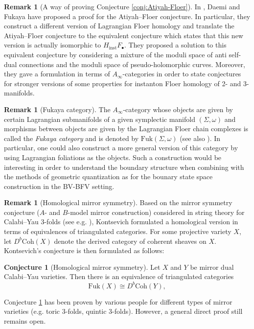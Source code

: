 \documentclass[11pt,colorinlistoftodos]{amsart}
\numberwithin{equation}{subsection}
\theoremstyle{plain}
\theoremstyle{definition}
\newtheorem{Conj}[thm]{Conjecture}
\newtheorem{rem}[thm]{Remark}
\theoremstyle{remark}
\begin{document}
\begin{rem}[A way of proving Conjecture \ref{conj:Atiyah-Floer}]
In \cite{DaemiFukaya2017}, Daemi and Fukaya have proposed a proof for the Atiyah--Floer conjecture. In particular, they construct a different version of Lagrangian Floer homology and translate the Atiyah--Floer conjecture to the equivalent conjecture which states that this new version is actually isomorphic to $H_\mathrm{inst}F_\bullet$. They proposed a solution to this equivalent conjecture by considering a mixture of the moduli space of anti self-dual connections and the moduli space of pseudo-holomorphic curves. 
Moreover, they gave a formulation in terms of $A_\infty$-categories in order to state conjectures for stronger versions of some properties for instanton Floer homology of 2- and 3-manifolds. 
\end{rem}

\begin{rem}[Fukaya category]
The $A_\infty$-category whose objects are given by certain Lagrangian submanifolds of a given symplectic manifold $(\Sigma,\omega)$ and morphisms between objects are given by the Lagrangian Floer chain complexes is called the \emph{Fukaya category} \cite{Fukaya1993} and is denoted by $\mathrm{Fuk}(\Sigma,\omega)$ (see also \cite{FukayaOhOhtaOno2009_1,FukayaOhOhtaOno2009_2,Kontsevich1994_2,Auroux2014}). In particular, one could also construct a more general version of this category by using Lagrangian foliations as the objects. Such a construction would be interesting in order to understand the boundary structure when combining with the methods of geometric quantization as for the bounary state space construction in the BV-BFV setting. 
\end{rem}


\begin{rem}[Homological mirror symmetry]
Based on the mirror symmetry conjecture ($A$- and $B$-model mirror construction) considered in string theory for Calabi--Yau 3-folds (see e.g. \cite{Yau1992,HZKKTVPV2003}), Kontsevich formulated a homological version in terms of equivalences of triangulated categories. For some projective variety $X$, let $D^b\mathrm{Coh}(X)$ denote the derived category of coherent sheaves on $X$. Kontsevich's conjecture is then formulated as follows:
\begin{Conj}[Homological mirror symmetry\cite{Kontsevich1994_2}]
\label{conj:HMS}
Let $X$ and $Y$ be mirror dual Calabi--Yau varieties. Then there is an equivalence of triangulated categories 
\begin{equation}
    \label{eq:HMS}
    \mathrm{Fuk}(X)\cong D^b\mathrm{Coh}(Y),
\end{equation}
\end{Conj}
Conjecture \ref{conj:HMS} has been proven by various people for different types of mirror varieties (e.g. toric 3-folds, quintic 3-folds). However, a general direct proof still remains open.  
\end{rem}
\end{document}
